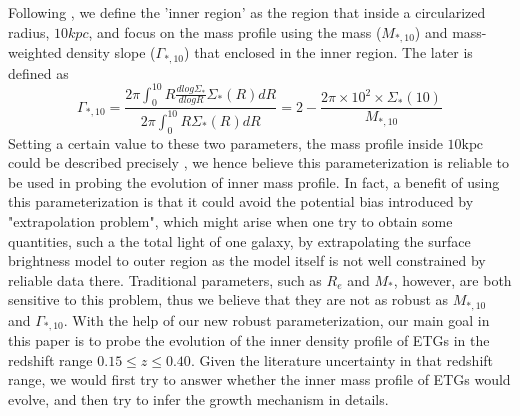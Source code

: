 \documentclass[fleqn,usenatbib]{mnras}
\begin{document}
\par Following \cite{Alessandro20}, we define the 'inner region' as the region that inside a circularized radius, $10kpc$, and focus on the mass profile using the mass ($M_{*,10}$) and mass-weighted density slope ($\Gamma_{*,10}$) that enclosed in the inner region. The later is defined as  
\begin{equation}
    \label{eq:gammastar10}
    \Gamma_{*,10} = \frac{2\pi \int_0^{10} R \frac{dlog\Sigma_*}{dlogR}\Sigma_*(R)dR}{2\pi \int_0^{10}R\Sigma_*(R)dR} = 2 - \frac{2\pi \times 10^2 \times \Sigma_*(10)}{M_{*,10}}
\end{equation} 
Setting a certain value to these two parameters, the mass profile inside $10 \text{kpc}$ could be described precisely \citep[see Fig.8 in][]{Alessandro20}, we hence believe this parameterization is reliable to be used in probing the evolution of inner mass profile. In fact, a benefit of using this parameterization is that it could avoid the potential bias introduced by "extrapolation problem", which might arise when one try to obtain some quantities, such a the total light of one galaxy, by extrapolating the surface brightness model to outer region as the model itself is not well constrained by reliable data there.
 Traditional parameters, such as $R_e$ and $M_*$, however, are both sensitive to this problem, thus we believe that they are not as robust as $M_{*,10}$ and $\Gamma_{*,10}$. With the help of our new robust parameterization, our main goal in this paper is to probe the evolution of the inner density profile of ETGs in the redshift range $0.15 \leq z \leq 0.40$. Given the literature uncertainty in that redshift range, we would first try to answer whether the inner mass profile of ETGs would evolve, and then try to infer the growth mechanism in details.
\end{document}
